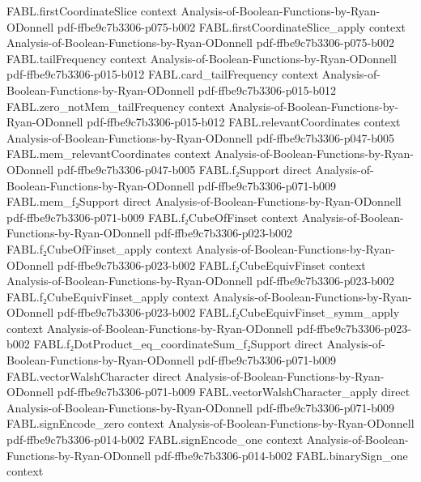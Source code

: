 \begin{theorem}
\proofstep
  {FABL.firstCoordinateSlice}
  {context}
  {Analysis-of-Boolean-Functions-by-Ryan-ODonnell}
  {pdf-ffbe9c7b3306-p075-b002}
\proofstep
  {FABL.firstCoordinateSlice_apply}
  {context}
  {Analysis-of-Boolean-Functions-by-Ryan-ODonnell}
  {pdf-ffbe9c7b3306-p075-b002}
\proofstep
  {FABL.tailFrequency}
  {context}
  {Analysis-of-Boolean-Functions-by-Ryan-ODonnell}
  {pdf-ffbe9c7b3306-p015-b012}
\proofstep
  {FABL.card_tailFrequency}
  {context}
  {Analysis-of-Boolean-Functions-by-Ryan-ODonnell}
  {pdf-ffbe9c7b3306-p015-b012}
\proofstep
  {FABL.zero_notMem_tailFrequency}
  {context}
  {Analysis-of-Boolean-Functions-by-Ryan-ODonnell}
  {pdf-ffbe9c7b3306-p015-b012}
\proofstep
  {FABL.relevantCoordinates}
  {context}
  {Analysis-of-Boolean-Functions-by-Ryan-ODonnell}
  {pdf-ffbe9c7b3306-p047-b005}
\proofstep
  {FABL.mem_relevantCoordinates}
  {context}
  {Analysis-of-Boolean-Functions-by-Ryan-ODonnell}
  {pdf-ffbe9c7b3306-p047-b005}
\proofstep
  {FABL.f₂Support}
  {direct}
  {Analysis-of-Boolean-Functions-by-Ryan-ODonnell}
  {pdf-ffbe9c7b3306-p071-b009}
\proofstep
  {FABL.mem_f₂Support}
  {direct}
  {Analysis-of-Boolean-Functions-by-Ryan-ODonnell}
  {pdf-ffbe9c7b3306-p071-b009}
\proofstep
  {FABL.f₂CubeOfFinset}
  {context}
  {Analysis-of-Boolean-Functions-by-Ryan-ODonnell}
  {pdf-ffbe9c7b3306-p023-b002}
\proofstep
  {FABL.f₂CubeOfFinset_apply}
  {context}
  {Analysis-of-Boolean-Functions-by-Ryan-ODonnell}
  {pdf-ffbe9c7b3306-p023-b002}
\proofstep
  {FABL.f₂CubeEquivFinset}
  {context}
  {Analysis-of-Boolean-Functions-by-Ryan-ODonnell}
  {pdf-ffbe9c7b3306-p023-b002}
\proofstep
  {FABL.f₂CubeEquivFinset_apply}
  {context}
  {Analysis-of-Boolean-Functions-by-Ryan-ODonnell}
  {pdf-ffbe9c7b3306-p023-b002}
\proofstep
  {FABL.f₂CubeEquivFinset_symm_apply}
  {context}
  {Analysis-of-Boolean-Functions-by-Ryan-ODonnell}
  {pdf-ffbe9c7b3306-p023-b002}
\proofstep
  {FABL.f₂DotProduct_eq_coordinateSum_f₂Support}
  {direct}
  {Analysis-of-Boolean-Functions-by-Ryan-ODonnell}
  {pdf-ffbe9c7b3306-p071-b009}
\proofstep
  {FABL.vectorWalshCharacter}
  {direct}
  {Analysis-of-Boolean-Functions-by-Ryan-ODonnell}
  {pdf-ffbe9c7b3306-p071-b009}
\proofstep
  {FABL.vectorWalshCharacter_apply}
  {direct}
  {Analysis-of-Boolean-Functions-by-Ryan-ODonnell}
  {pdf-ffbe9c7b3306-p071-b009}
\proofstep
  {FABL.signEncode_zero}
  {context}
  {Analysis-of-Boolean-Functions-by-Ryan-ODonnell}
  {pdf-ffbe9c7b3306-p014-b002}
\proofstep
  {FABL.signEncode_one}
  {context}
  {Analysis-of-Boolean-Functions-by-Ryan-ODonnell}
  {pdf-ffbe9c7b3306-p014-b002}
\proofstep
  {FABL.binarySign_one}
  {context}

\end{theorem}
